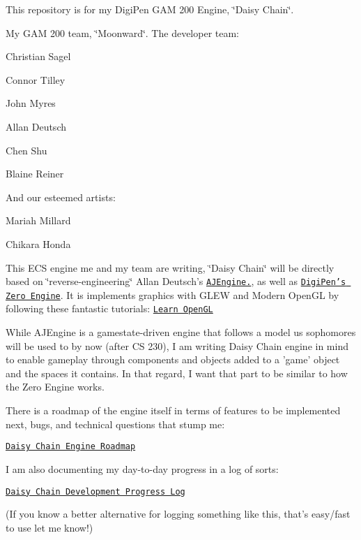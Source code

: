 This repository is for my Digi\-Pen G\-A\-M 200 Engine, \char`\"{}\-Daisy Chain\char`\"{}.

My G\-A\-M 200 team, \char`\"{}\-Moonward\char`\"{}. The developer team\-:
\begin{DoxyItemize}
\item Christian Sagel
\item Connor Tilley
\item John Myres
\item Allan Deutsch
\item Chen Shu
\item Blaine Reiner
\end{DoxyItemize}

And our esteemed artists\-:
\begin{DoxyItemize}
\item Mariah Millard
\item Chikara Honda
\end{DoxyItemize}

This E\-C\-S engine me and my team are writing, \char`\"{}\-Daisy Chain\char`\"{} will be directly based on \char`\"{}reverse-\/engineering\char`\"{} Allan Deutsch's \href{https://github.com/Masstronaut/aljeengine}{\tt A\-J\-Engine.}, as well as \href{http://zero.digipen.edu/}{\tt Digi\-Pen's Zero Engine}. It is implements graphics with G\-L\-E\-W and Modern Open\-G\-L by following these fantastic tutorials\-: \href{http://learnopengl.com/}{\tt Learn Open\-G\-L}

While A\-J\-Engine is a gamestate-\/driven engine that follows a model us sophomores will be used to by now (after C\-S 230), I am writing Daisy Chain engine in mind to enable gameplay through components and objects added to a 'game' object and the spaces it contains. In that regard, I want that part to be similar to how the Zero Engine works.

There is a roadmap of the engine itself in terms of features to be implemented next, bugs, and technical questions that stump me\-:

\href{https://trello.com/b/vDmSAbFm/daisy-chain-engine-roadmap}{\tt Daisy Chain Engine Roadmap}

I am also documenting my day-\/to-\/day progress in a log of sorts\-:

\href{https://docs.google.com/spreadsheets/d/1owN00AVVGzIan5TGH_BJrXHaZ0YIHjNjQBijRDP-hFw/edit?usp=sharing}{\tt Daisy Chain Development Progress Log}

(If you know a better alternative for logging something like this, that's easy/fast to use let me know!) 